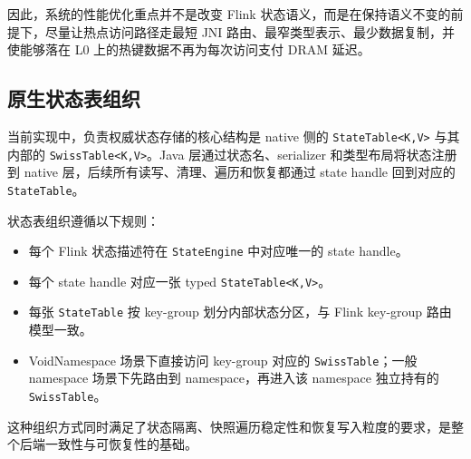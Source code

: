 \documentclass[a4paper,11pt]{article}
\begin{document}
因此，系统的性能优化重点并不是改变 Flink 状态语义，而是在保持语义不变的前提下，尽量让热点访问路径走最短 JNI 路由、最窄类型表示、最少数据复制，并使能够落在 L0 上的热键数据不再为每次访问支付 DRAM 延迟。

\subsection{原生状态表组织}

当前实现中，负责权威状态存储的核心结构是 native 侧的 \texttt{StateTable<K,V>} 与其内部的 \texttt{SwissTable<K,V>}。Java 层通过状态名、serializer 和类型布局将状态注册到 native 层，后续所有读写、清理、遍历和恢复都通过 state handle 回到对应的 \texttt{StateTable}。

状态表组织遵循以下规则：

\begin{itemize}
  \item 每个 Flink 状态描述符在 \texttt{StateEngine} 中对应唯一的 state handle。
  \item 每个 state handle 对应一张 typed \texttt{StateTable<K,V>}。
  \item 每张 \texttt{StateTable} 按 key-group 划分内部状态分区，与 Flink key-group 路由模型一致。
  \item VoidNamespace 场景下直接访问 key-group 对应的 \texttt{SwissTable}；一般 namespace 场景下先路由到 namespace，再进入该 namespace 独立持有的 \texttt{SwissTable}。
\end{itemize}

这种组织方式同时满足了状态隔离、快照遍历稳定性和恢复写入粒度的要求，是整个后端一致性与可恢复性的基础。
\end{document}
